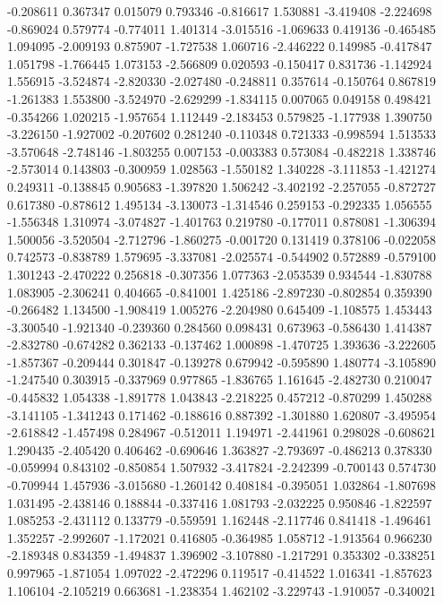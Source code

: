 -0.208611
0.367347
0.015079
0.793346
-0.816617
1.530881
-3.419408
-2.224698
-0.869024
0.579774
-0.774011
1.401314
-3.015516
-1.069633
0.419136
-0.465485
1.094095
-2.009193
0.875907
-1.727538
1.060716
-2.446222
0.149985
-0.417847
1.051798
-1.766445
1.073153
-2.566809
0.020593
-0.150417
0.831736
-1.142924
1.556915
-3.524874
-2.820330
-2.027480
-0.248811
0.357614
-0.150764
0.867819
-1.261383
1.553800
-3.524970
-2.629299
-1.834115
0.007065
0.049158
0.498421
-0.354266
1.020215
-1.957654
1.112449
-2.183453
0.579825
-1.177938
1.390750
-3.226150
-1.927002
-0.207602
0.281240
-0.110348
0.721333
-0.998594
1.513533
-3.570648
-2.748146
-1.803255
0.007153
-0.003383
0.573084
-0.482218
1.338746
-2.573014
0.143803
-0.300959
1.028563
-1.550182
1.340228
-3.111853
-1.421274
0.249311
-0.138845
0.905683
-1.397820
1.506242
-3.402192
-2.257055
-0.872727
0.617380
-0.878612
1.495134
-3.130073
-1.314546
0.259153
-0.292335
1.056555
-1.556348
1.310974
-3.074827
-1.401763
0.219780
-0.177011
0.878081
-1.306394
1.500056
-3.520504
-2.712796
-1.860275
-0.001720
0.131419
0.378106
-0.022058
0.742573
-0.838789
1.579695
-3.337081
-2.025574
-0.544902
0.572889
-0.579100
1.301243
-2.470222
0.256818
-0.307356
1.077363
-2.053539
0.934544
-1.830788
1.083905
-2.306241
0.404665
-0.841001
1.425186
-2.897230
-0.802854
0.359390
-0.266482
1.134500
-1.908419
1.005276
-2.204980
0.645409
-1.108575
1.453443
-3.300540
-1.921340
-0.239360
0.284560
0.098431
0.673963
-0.586430
1.414387
-2.832780
-0.674282
0.362133
-0.137462
1.000898
-1.470725
1.393636
-3.222605
-1.857367
-0.209444
0.301847
-0.139278
0.679942
-0.595890
1.480774
-3.105890
-1.247540
0.303915
-0.337969
0.977865
-1.836765
1.161645
-2.482730
0.210047
-0.445832
1.054338
-1.891778
1.043843
-2.218225
0.457212
-0.870299
1.450288
-3.141105
-1.341243
0.171462
-0.188616
0.887392
-1.301880
1.620807
-3.495954
-2.618842
-1.457498
0.284967
-0.512011
1.194971
-2.441961
0.298028
-0.608621
1.290435
-2.405420
0.406462
-0.690646
1.363827
-2.793697
-0.486213
0.378330
-0.059994
0.843102
-0.850854
1.507932
-3.417824
-2.242399
-0.700143
0.574730
-0.709944
1.457936
-3.015680
-1.260142
0.408184
-0.395051
1.032864
-1.807698
1.031495
-2.438146
0.188844
-0.337416
1.081793
-2.032225
0.950846
-1.822597
1.085253
-2.431112
0.133779
-0.559591
1.162448
-2.117746
0.841418
-1.496461
1.352257
-2.992607
-1.172021
0.416805
-0.364985
1.058712
-1.913564
0.966230
-2.189348
0.834359
-1.494837
1.396902
-3.107880
-1.217291
0.353302
-0.338251
0.997965
-1.871054
1.097022
-2.472296
0.119517
-0.414522
1.016341
-1.857623
1.106104
-2.105219
0.663681
-1.238354
1.462102
-3.229743
-1.910057
-0.340021

